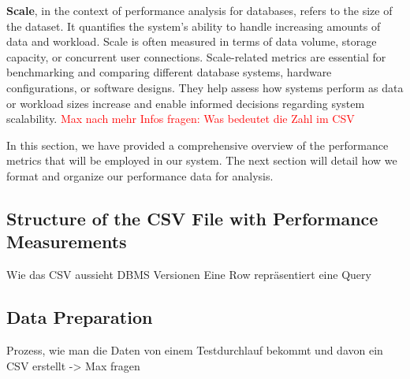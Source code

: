 \textbf{Scale}, in the context of performance analysis for databases, refers to the size of the dataset. It quantifies the system's ability to handle increasing amounts of data and workload. Scale is often measured in terms of data volume, storage capacity, or concurrent user connections. Scale-related metrics are essential for benchmarking and comparing different database systems, hardware configurations, or software designs. They help assess how systems perform as data or workload sizes increase and enable informed decisions regarding system scalability.
\textcolor{red}{Max nach mehr Infos fragen: Was bedeutet die Zahl im CSV}

In this section, we have provided a comprehensive overview of the performance metrics that will be employed in our system. The next section will detail how we format and organize our performance data for analysis.



\subsection{Structure of the CSV File with Performance Measurements}

Wie das CSV aussieht
DBMS Versionen
Eine Row repräsentiert eine Query
\subsection{Data Preparation}
Prozess, wie man die Daten von einem Testdurchlauf bekommt und davon ein CSV erstellt
-> Max fragen

